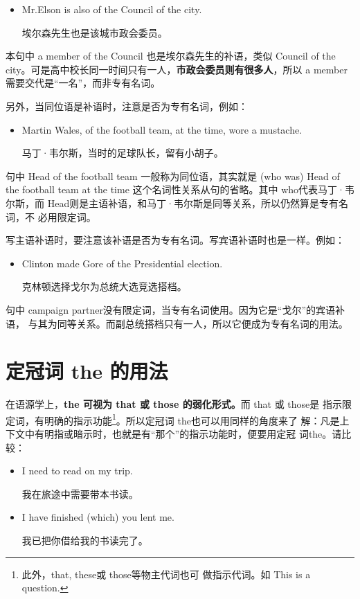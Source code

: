 \begin{itemize}
\item  Mr.Elson is also  of the Council of the city.

  埃尔森先生也是该城市政会委员。
\end{itemize}

本句中 a member of the Council 也是埃尔森先生的补语，类似 Council of the
city。可是高中校长同一时间只有一人，\textbf{市政会委员则有很多人}，所以 a
member需要交代是“一名”，而非专有名词。

另外，当同位语是补语时，注意是否为专有名词，例如：
\begin{itemize}
\item Martin Wales,  of the football team, at the time, wore a
  mustache.

  马丁·韦尔斯，当时的足球队长，留有小胡子。
\end{itemize}

句中 Head of the football team 一般称为同位语，其实就是 (who was) Head of
the football team at the time 这个名词性关系从句的省略。其中 who代表马丁·韦
尔斯，而 Head则是主语补语，和马丁·韦尔斯是同等关系，所以仍然算是专有名词，不
必用限定词。

写主语补语时，要注意该补语是否为专有名词。写宾语补语时也是一样。例如：
\begin{itemize}
\item  Clinton made Gore  of the Presidential election.

  克林顿选择戈尔为总统大选竞选搭档。
\end{itemize}

句中 campaign partner没有限定词，当专有名词使用。因为它是“戈尔”的宾语补语，
与其为同等关系。而副总统搭档只有一人，所以它便成为专有名词的用法。

\section{定冠词 the 的用法}

在语源学上，\textbf{the 可视为 that 或 those 的弱化形式。}而 that 或 those是
指示限定词，有明确的指示功能\footnote{此外，that, these或 those等物主代词也可
  做指示代词。如 This is a question. }。所以定冠词 the也可以用同样的角度来了
解：凡是上下文中有明指或暗示时，也就是有“那个”的指示功能时，便要用定冠
词the。请比较：
\begin{itemize}
\item  I need  to read on my trip.

  我在旅途中需要带本书读。
\item  I have finished  (which) you lent me.

  我已把你借给我的书读完了。
\end{itemize}

